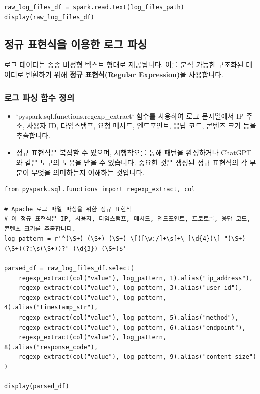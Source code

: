 \documentclass[11pt,a4paper]{article}
\begin{document}
\begin{lstlisting}
raw_log_files_df = spark.read.text(log_files_path)
display(raw_log_files_df)
\end{lstlisting}

\subsection{정규 표현식을 이용한 로그 파싱}

\begin{conceptbox}
로그 데이터는 종종 비정형 텍스트 형태로 제공됩니다. 이를 분석 가능한 구조화된 데이터로 변환하기 위해 \textbf{정규 표현식(Regular Expression)}을 사용합니다.
\end{conceptbox}

\subsubsection{로그 파싱 함수 정의}
\begin{itemize}
    \item `pyspark.sql.functions.regexp_extract` 함수를 사용하여 로그 문자열에서 IP 주소, 사용자 ID, 타임스탬프, 요청 메서드, 엔드포인트, 응답 코드, 콘텐츠 크기 등을 추출합니다.
    \item 정규 표현식은 복잡할 수 있으며, 시행착오를 통해 패턴을 완성하거나 ChatGPT와 같은 도구의 도움을 받을 수 있습니다. 중요한 것은 생성된 정규 표현식의 각 부분이 무엇을 의미하는지 이해하는 것입니다.
\end{itemize}

\begin{lstlisting}
from pyspark.sql.functions import regexp_extract, col

# Apache 로그 파일 파싱을 위한 정규 표현식
# 이 정규 표현식은 IP, 사용자, 타임스탬프, 메서드, 엔드포인트, 프로토콜, 응답 코드, 콘텐츠 크기를 추출합니다.
log_pattern = r'^(\S+) (\S+) (\S+) \[([\w:/]+\s[+\-]\d{4})\] "(\S+) (\S+)(?:\s(\S+))?" (\d{3}) (\S+)$'

parsed_df = raw_log_files_df.select(
    regexp_extract(col("value"), log_pattern, 1).alias("ip_address"),
    regexp_extract(col("value"), log_pattern, 3).alias("user_id"),
    regexp_extract(col("value"), log_pattern, 4).alias("timestamp_str"),
    regexp_extract(col("value"), log_pattern, 5).alias("method"),
    regexp_extract(col("value"), log_pattern, 6).alias("endpoint"),
    regexp_extract(col("value"), log_pattern, 8).alias("response_code"),
    regexp_extract(col("value"), log_pattern, 9).alias("content_size")
)

display(parsed_df)
\end{lstlisting}
\end{document}
